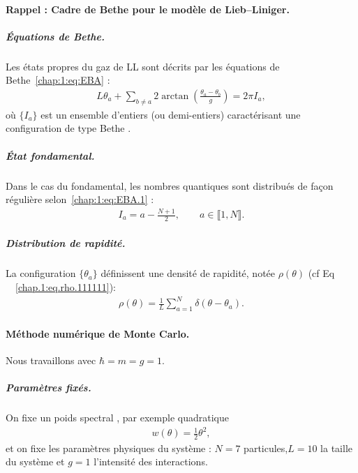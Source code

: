 \begin{mdframed}[
	linewidth=0.5pt, 
	backgroundcolor=gray!5, 
	roundcorner=50pt,	
	innerleftmargin=5pt,
    innerrightmargin=5pt,
    innertopmargin=-10pt,
    innerbottommargin=2pt,
    leftmargin=2pt,
    rightmargin=2pt
	]
\paragraph{Rappel : Cadre de Bethe pour le modèle de Lieb–Liniger.}

\subparagraph{Équations de Bethe.}  
Les états propres du gaz de \gls{LL} sont décrits par les équations de Bethe~\eqref{chap:1:eq:EBA} :
\begin{eqnarray}\label{chap:4:eq:EBA}
	L \theta_a + \sum_{b \ne a} 2 \arctan \!\left( \frac{\theta_a - \theta_b}{g} \right) = 2 \pi I_a,
\end{eqnarray}
où \( \{I_a\} \) est un ensemble d’entiers (ou demi-entiers) caractérisant une configuration de type Bethe .%

\subparagraph{État fondamental.}  
Dans le cas du fondamental, les nombres quantiques sont distribués de façon régulière selon~\eqref{chap:1:eq:EBA.1} :
\begin{eqnarray}\label{chap:4:eq:EBA.1}
	I_a = a - \frac{N+1}{2}, \qquad a \in \llbracket 1 , N \rrbracket.
\end{eqnarray}

\subparagraph{Distribution de rapidité.}  
La configuration \( \{\theta_a\} \) définissent une densité de rapidité, notée \( \rho(\theta) \) (cf Eq ~ \eqref{chap.1:eq.rho.111111}):
\begin{eqnarray}\label{chap.4:eq.rho.111111}
	\rho(\theta) = \frac{1}{L} \sum_{a=1}^N \delta(\theta - \theta_a).
\end{eqnarray}

\end{mdframed}

\paragraph{Méthode numérique de Monte Carlo.}

Nous travaillons avec $ \hbar = m = g = 1 $.
\subparagraph{Paramètres fixés.}
On fixe un poids spectral , par exemple quadratique
\begin{eqnarray}
	w(\theta) = \tfrac{1}{2} \theta^2,
\end{eqnarray}
et on fixe les paramètres physiques du système : \( N = 7 \) particules,\( L = 10 \) la taille du système et \( g = 1 \)  l’intensité des interactions.



